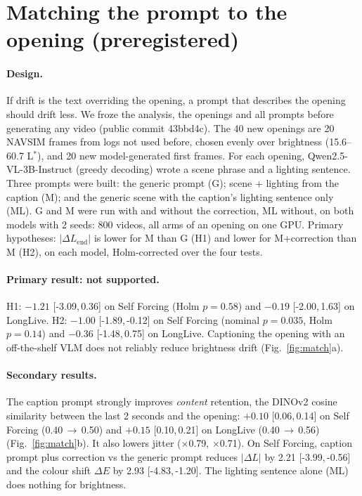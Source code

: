 \documentclass[11pt]{article}
\newcommand{\Lstar}{L$^{*}$}
\newcommand{\ci}[2]{[#1,\,#2]}
\begin{document}
\section{Matching the prompt to the opening (preregistered)}\label{sec:match}
\paragraph{Design.} If drift is the text overriding the opening, a prompt that describes the opening should drift
less. We froze the analysis, the openings and all prompts before generating any video (public commit 43bbd4c). The 40
new openings are 20 NAVSIM frames from logs not used before, chosen evenly over brightness (15.6--60.7 \Lstar), and 20
new model-generated first frames. For each opening, Qwen2.5-VL-3B-Instruct (greedy decoding) wrote a scene phrase and
a lighting sentence. Three prompts were built: the generic prompt (G); scene + lighting from the caption (M); and the
generic scene with the caption's lighting sentence only (ML). G and M were run with and without the correction, ML
without, on both models with 2 seeds: 800 videos, all arms of an opening on one GPU. Primary hypotheses: $|\Delta
L_\text{end}|$ is lower for M than G (H1) and lower for M+correction than M (H2), on each model, Holm-corrected over the
four tests.

\paragraph{Primary result: not supported.} H1: $-1.21$ \ci{-3.09}{0.36} on Self Forcing (Holm $p=0.58$) and $-0.19$
\ci{-2.00}{1.63} on LongLive. H2: $-1.00$ \ci{-1.89}{-0.12} on Self Forcing (nominal $p=0.035$, Holm $p=0.14$) and
$-0.36$ \ci{-1.48}{0.75} on LongLive. Captioning the opening with an off-the-shelf VLM does not reliably reduce
brightness drift (Fig.~\ref{fig:match}a).

\paragraph{Secondary results.} The caption prompt strongly improves \emph{content} retention, the DINOv2 cosine
similarity between the last 2 seconds and the opening: $+0.10$ \ci{0.06}{0.14} on Self Forcing (0.40\,$\to$\,0.50) and
$+0.15$ \ci{0.10}{0.21} on LongLive (0.40\,$\to$\,0.56) (Fig.~\ref{fig:match}b). It also lowers jitter ($\times$0.79,
$\times$0.71). On Self Forcing, caption prompt plus correction vs the generic prompt reduces $|\Delta L|$ by 2.21
\ci{-3.99}{-0.56} and the colour shift $\Delta E$ by 2.93 \ci{-4.83}{-1.20}. The lighting sentence alone (ML) does
nothing for brightness.
\end{document}
